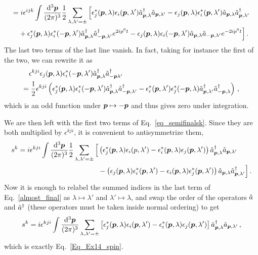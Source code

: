\begin{sol}
\begin{equation}
\begin{split}
            = &\;  i \epsilon^{ijk} \int \frac{{\rm d}^3\boldsymbol{p}}{(2\pi)^{3}} \frac{1}{2}\sum_{\lambda, \lambda'=\pm}\Big[\epsilon^*_{j}(\boldsymbol{p},\lambda)\epsilon_{i}(\boldsymbol{p}, \lambda')\hat{a}^\dagger_{\boldsymbol{p},\lambda}\hat{a}_{\boldsymbol{p}, \lambda'} - \epsilon_{j}(\boldsymbol{p},\lambda)\epsilon^*_{i}(\boldsymbol{p}, \lambda')\hat{a}_{\boldsymbol{p}, \lambda}\hat{a}^\dagger_{\boldsymbol{p}, \lambda'} \\
            & + \epsilon^*_{j}(\boldsymbol{p},\lambda)\epsilon^*_{i}(-\boldsymbol{p}, \lambda')\hat{a}^\dagger_{\boldsymbol{p},\lambda}\hat{a}^\dagger_{-\boldsymbol{p}, \lambda'}e^{2ip^{0}t} - \epsilon_{j}(\boldsymbol{p},\lambda)\epsilon_{i}(-\boldsymbol{p}, \lambda')\hat{a}_{\boldsymbol{p},\lambda}\hat{a}_{-\boldsymbol{p}, \lambda'}e^{-2ip^{0}t}\Big]\, .
    \end{split}
    \end{equation}
    The last two terms of the last line vanish. In fact, taking for instance the first of the two, we can rewrite it as
    \begin{equation}
    \begin{split}
        & \epsilon^{kji} \epsilon_{j}(\boldsymbol{p},\lambda)\epsilon^*_{i}(-\boldsymbol{p}, \lambda')\hat{a}^\dagger_{\boldsymbol{p}, \lambda}\hat{a}^\dagger_{-\boldsymbol{p} \lambda'}  \\
        = &\; \frac{1}{2}\epsilon^{kji}\left(\epsilon^*_{j}(\boldsymbol{p},\lambda)\epsilon^*_{i}(-\boldsymbol{p}, \lambda')\hat{a}^\dagger_{\boldsymbol{p},\lambda}\hat{a}^\dagger_{-\boldsymbol{p},\lambda'}
        - \epsilon^*_{i}(\boldsymbol{p},\lambda')\epsilon^*_{j}(-\boldsymbol{p}, \lambda)\hat{a}^\dagger_{\boldsymbol{p}, \lambda'}\hat{a}^\dagger_{-\boldsymbol{p}, \lambda}\right)\,,
    \end{split}
    \end{equation}
    which is an odd function under $\boldsymbol{p} \mapsto - \boldsymbol{p}$ and thus gives zero under integration. \par 
    We are then left with the first two terms of Eq.~\eqref{eq_semifinalsk}. Since they are both multiplied by $\epsilon^{kji}$, it is convenient to antisymmetrize them,
    \begin{equation}
    \label{almost_final}
    \begin{split}
        s^{k} = i\epsilon^{kji} \int \frac{{\rm d}^3\boldsymbol{p}}{(2\pi)^{3}}\frac{1}{2}\sum_{\lambda, \lambda'=\pm}\Big[&\left(\epsilon^*_{j}(\boldsymbol{p},\lambda)\epsilon_{i}(p, \lambda') - \epsilon^*_{i}(\boldsymbol{p},\lambda)\epsilon_{j}(\boldsymbol{p}, \lambda')\right)\hat{a}^\dagger_{\boldsymbol{p}, \lambda}\hat{a}_{\boldsymbol{p}, \lambda'} \\
        &- \left(\epsilon_{j}(\boldsymbol{p},\lambda)\epsilon^*_{i}(\boldsymbol{p}, \lambda') - \epsilon_{i}(\boldsymbol{p},\lambda)\epsilon^*_{j}(\boldsymbol{p}, \lambda')\right)\hat{a}_{\boldsymbol{p},\lambda}\hat{a}^\dagger_{\boldsymbol{p}, \lambda'}\Big]\, .
    \end{split}
    \end{equation}
    Now it is enough to relabel the summed indices in the last term of Eq.~\eqref{almost_final} as $\lambda \mapsto \lambda'$ and $\lambda' \mapsto \lambda$, and swap the order of the operators $\hat{a}$ and $\hat{a}^\dagger$ (these operators must be taken inside normal ordering) to get 
    \begin{equation}
        s^{k} = i \epsilon^{kji} \int \frac{{\rm d}^3\boldsymbol{p}}{(2\pi)^{3}}\sum_{\lambda ,\lambda'=\pm}\left[\epsilon^*_{j}(\boldsymbol{p},\lambda)\epsilon_{i}(\boldsymbol{p}, \lambda') - \epsilon^*_{i}(\boldsymbol{p},\lambda)\epsilon_{j}(\boldsymbol{p}, \lambda')\right]\hat{a}^\dagger_{\boldsymbol{p},\lambda}\hat{a}_{\boldsymbol{p}, \lambda'} \,,
    \end{equation}
    which is exactly Eq.~\eqref{Eq_Ex14_spin}.
\end{sol}